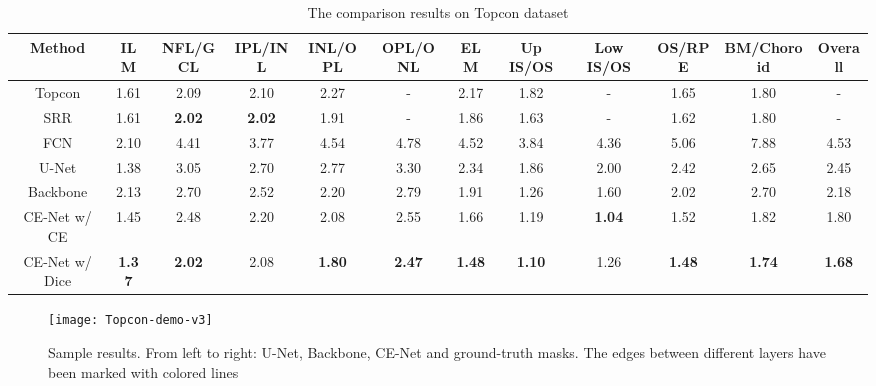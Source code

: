 \documentclass[journal]{IEEEtran}
\begin{document}
\begin{table*}[t]
\centering
\caption{The comparison results on Topcon dataset}\label{Topcon-label}
\begin{tabular}{c|c|c|c|c|c|c|c|c|c|c|c}
\hline
 Method& ILM   & NFL/GCL & IPL/INL & INL/OPL & OPL/ONL & ELM   & Up IS/OS & Low IS/OS & OS/RPE & BM/Choroid & Overall \\ \hline
  Topcon \cite{cheng2016speckle} & 1.61 & 2.09 & 2.10 & 2.27 & - & 2.17 & 1.82 & - & 1.65 &1.80  &-\\ \hline
  SRR \cite{cheng2016speckle} & 1.61 & \textbf{2.02} & \textbf{2.02} & 1.91 & - & 1.86 & 1.63 & - & 1.62 & 1.80 & -\\ \hline
  FCN \cite{long2015fully} & 2.10 & 4.41 & 3.77 & 4.54 & 4.78 & 4.52 & 3.84 & 4.36 & 5.06 & 7.88  &4.53\\ \hline
  U-Net \cite{ronneberger2015u} & 1.38 & 3.05 & 2.70 & 2.77 & 3.30 & 2.34 & 1.86 & 2.00 & 2.42 & 2.65 & 2.45 \\ \hline
Backbone & 2.13 & 2.70 & 2.52 & 2.20 & 2.79 & 1.91 & 1.26 & 1.60 & 2.02 & 2.70 &2.18 \\ \hline
CE-Net w/ CE & 1.45 & 2.48 & 2.20 & 2.08 & 2.55 &1.66 & 1.19 & \textbf{1.04} & 1.52 & 1.82 & 1.80\\ \hline
  CE-Net w/ Dice & \textbf{1.37} & \textbf{2.02} & 2.08 & \textbf{1.80} & \textbf{2.47} & \textbf{1.48} & \textbf{1.10} & 1.26 & \textbf{1.48} & \textbf{1.74} & \textbf{1.68}\\ \hline

\end{tabular}
\end{table*}


\begin{figure*}[t]
    \begin{center}

    \texttt{[image: Topcon-demo-v3]}
    \end{center}
       \caption{Sample results. From left to right: U-Net, Backbone, CE-Net and ground-truth masks. The edges between different layers have been marked with colored lines}
    \label{topcon-demo1}
\end{figure*}
\end{document}
